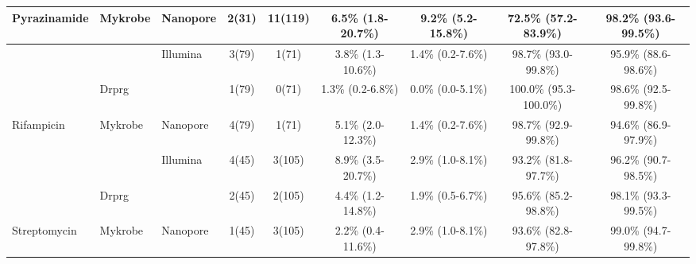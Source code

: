 \begin{table}
{\begin{tabular}{|l|l|l|c|c|c|c|c|c|}
\multirow{-3}{*}{Pyrazinamide}  & Mykrobe                 & \multirow{-2}{*}{Nanopore} & \cellcolor[HTML]{EFEFEF}2(31)  & \cellcolor[HTML]{EFEFEF}11(119) & \cellcolor[HTML]{EFEFEF}6.5\% (1.8-20.7\%)  & \cellcolor[HTML]{EFEFEF}9.2\% (5.2-15.8\%)  & \cellcolor[HTML]{EFEFEF}72.5\% (57.2-83.9\%)   & \cellcolor[HTML]{EFEFEF}98.2\% (93.6-99.5\%)   \\ \hline
                                &                         & Illumina                   & 3(79)                          & 1(71)                           & 3.8\% (1.3-10.6\%)                          & 1.4\% (0.2-7.6\%)                           & 98.7\% (93.0-99.8\%)                           & 95.9\% (88.6-98.6\%)                           \\ \cline{3-9} 
                                & \multirow{-2}{*}{Drprg} &                            & \cellcolor[HTML]{EFEFEF}1(79)  & \cellcolor[HTML]{EFEFEF}0(71)   & \cellcolor[HTML]{EFEFEF}1.3\% (0.2-6.8\%)   & \cellcolor[HTML]{EFEFEF}0.0\% (0.0-5.1\%)   & \cellcolor[HTML]{EFEFEF}100.0\% (95.3-100.0\%) & \cellcolor[HTML]{EFEFEF}98.6\% (92.5-99.8\%)   \\ \cline{2-2} \cline{4-9} 
\multirow{-3}{*}{Rifampicin}    & Mykrobe                 & \multirow{-2}{*}{Nanopore} & 4(79)                          & 1(71)                           & 5.1\% (2.0-12.3\%)                          & 1.4\% (0.2-7.6\%)                           & 98.7\% (92.9-99.8\%)                           & 94.6\% (86.9-97.9\%)                           \\ \hline
                                &                         & Illumina                   & \cellcolor[HTML]{EFEFEF}4(45)  & \cellcolor[HTML]{EFEFEF}3(105)  & \cellcolor[HTML]{EFEFEF}8.9\% (3.5-20.7\%)  & \cellcolor[HTML]{EFEFEF}2.9\% (1.0-8.1\%)   & \cellcolor[HTML]{EFEFEF}93.2\% (81.8-97.7\%)   & \cellcolor[HTML]{EFEFEF}96.2\% (90.7-98.5\%)   \\ \cline{3-9} 
                                & \multirow{-2}{*}{Drprg} &                            & 2(45)                          & 2(105)                          & 4.4\% (1.2-14.8\%)                          & 1.9\% (0.5-6.7\%)                           & 95.6\% (85.2-98.8\%)                           & 98.1\% (93.3-99.5\%)                           \\ \cline{2-2} \cline{4-9} 
\multirow{-3}{*}{Streptomycin}  & Mykrobe                 & \multirow{-2}{*}{Nanopore} & \cellcolor[HTML]{EFEFEF}1(45)  & \cellcolor[HTML]{EFEFEF}3(105)  & \cellcolor[HTML]{EFEFEF}2.2\% (0.4-11.6\%)  & \cellcolor[HTML]{EFEFEF}2.9\% (1.0-8.1\%)   & \cellcolor[HTML]{EFEFEF}93.6\% (82.8-97.8\%)   & \cellcolor[HTML]{EFEFEF}99.0\% (94.7-99.8\%)   \\ \hline

\end{tabular}}
\end{table}
